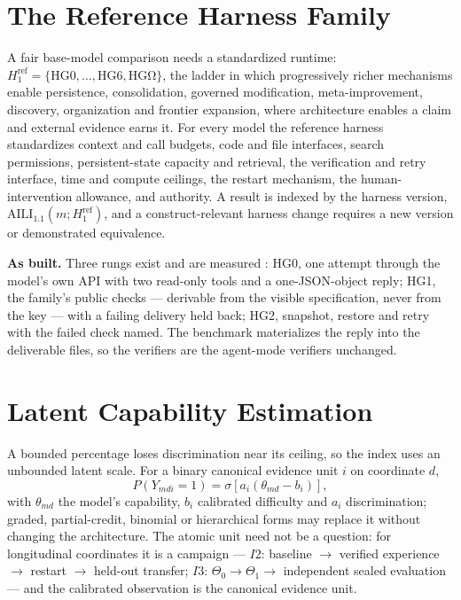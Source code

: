 \section{The Reference Harness Family}\label{sec:harness}

A fair base-model comparison needs a standardized runtime: $H^{\mathrm{ref}}_1 = \{\mathrm{HG0}, \ldots, \mathrm{HG6}, \mathrm{HG\Omega}\}$, the ladder in which progressively richer mechanisms enable persistence, consolidation, governed modification, meta-improvement, discovery, organization and frontier expansion, where architecture enables a claim and external evidence earns it. For every model the reference harness standardizes context and call budgets, code and file interfaces, search permissions, persistent-state capacity and retrieval, the verification and retry interface, time and compute ceilings, the restart mechanism, the human-intervention allowance, and authority. A result is indexed by the harness version, $\mathrm{AILI}_{1.1}(m; H^{\mathrm{ref}}_1)$, and a construct-relevant harness change requires a new version or demonstrated equivalence.

\textbf{As built.} Three rungs exist and are measured \citep{yang2026hilbench}: HG0, one attempt through the model's own API with two read-only tools and a one-JSON-object reply; HG1, the family's public checks --- derivable from the visible specification, never from the key --- with a failing delivery held back; HG2, snapshot, restore and retry with the failed check named. The benchmark materializes the reply into the deliverable files, so the verifiers are the agent-mode verifiers unchanged.

\section{Latent Capability Estimation}\label{sec:latent}

A bounded percentage loses discrimination near its ceiling, so the index uses an unbounded latent scale. For a binary canonical evidence unit $i$ on coordinate $d$,
\[
P(Y_{mdi} = 1) = \sigma\!\left[a_i(\theta_{md} - b_i)\right],
\]
with $\theta_{md}$ the model's capability, $b_i$ calibrated difficulty and $a_i$ discrimination; graded, partial-credit, binomial or hierarchical forms may replace it without changing the architecture. The atomic unit need not be a question: for longitudinal coordinates it is a campaign --- $I2$: baseline $\to$ verified experience $\to$ restart $\to$ held-out transfer; $I3$: $\Theta_0 \to \Theta_1 \to$ independent sealed evaluation --- and the calibrated observation is the canonical evidence unit.

